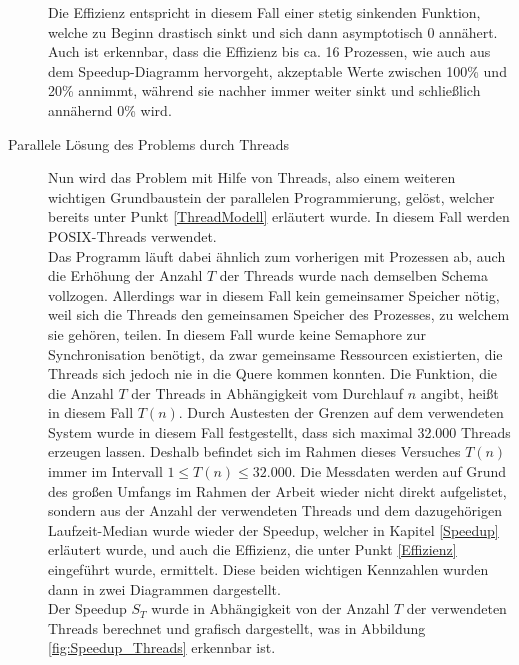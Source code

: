 \begin{description}
						Die Effizienz entspricht in diesem Fall einer stetig sinkenden Funktion, welche zu Beginn drastisch sinkt und sich dann asymptotisch 0 annähert. Auch ist erkennbar, dass die Effizienz bis ca. 16 Prozessen, wie auch aus dem Speedup-Diagramm hervorgeht, akzeptable Werte zwischen 100\% und 20\% annimmt, während sie nachher immer weiter sinkt und schließlich annähernd 0\% wird.
					
					\item[Parallele Lösung des Problems durch Threads]
						
						Nun wird das Problem mit Hilfe von Threads, also einem weiteren wichtigen Grundbaustein der parallelen Programmierung, gelöst, welcher bereits unter Punkt \ref{ThreadModell} erläutert wurde. In diesem Fall werden POSIX-Threads verwendet.\\
						Das Programm läuft dabei ähnlich zum vorherigen mit Prozessen ab, auch die Erhöhung der Anzahl $T$ der Threads wurde nach demselben Schema vollzogen. Allerdings war in diesem Fall kein gemeinsamer Speicher nötig, weil sich die Threads den gemeinsamen Speicher des Prozesses, zu welchem sie gehören, teilen. In diesem Fall wurde keine Semaphore zur Synchronisation benötigt, da zwar gemeinsame Ressourcen existierten, die Threads sich jedoch nie in die Quere kommen konnten. Die Funktion, die die Anzahl $T$ der Threads in Abhängigkeit vom Durchlauf $n$ angibt, heißt in diesem Fall $T(n)$.
						Durch Austesten der Grenzen auf dem verwendeten System wurde in diesem Fall festgestellt, dass sich maximal 32.000 Threads erzeugen lassen. Deshalb befindet sich im Rahmen dieses Versuches $T(n)$ immer im Intervall $1 \leq T(n) \leq 32.000$.
						Die Messdaten werden auf Grund des großen Umfangs im Rahmen der Arbeit wieder nicht direkt aufgelistet, sondern aus der Anzahl der verwendeten Threads und dem dazugehörigen Laufzeit-Median wurde wieder der Speedup, welcher in Kapitel \ref{Speedup} erläutert wurde, und auch die Effizienz, die unter Punkt \ref{Effizienz} eingeführt wurde, ermittelt. Diese beiden wichtigen Kennzahlen wurden dann in zwei Diagrammen dargestellt.\\
						Der Speedup $S_T$ wurde in Abhängigkeit von der Anzahl $T$ der verwendeten Threads berechnet und grafisch dargestellt, was in Abbildung \ref{fig:Speedup_Threads} erkennbar ist.
						

\end{description}
